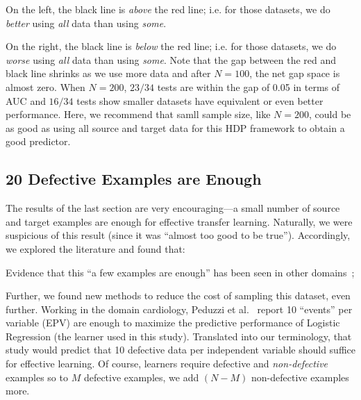 \squishlist
\item
  On the left, the black line is
  {\em above} the red line; i.e. for those datasets, we do {\em better} using
  {\em all} data than using {\em some}.
  \item
On the right, the black line is {\em below} the red
line; i.e. for those datasets, we do {\em worse}
using {\em all} data than using {\em some}.
\squishend
Note that the gap between the red and black line
shrinks as we use more data and after $N=100$, the
net gap space is almost zero.  When $N=200$, $23/34$
tests are within the gap of 0.05 in terms of AUC and
$16/34$ tests show smaller datasets have equivalent
or even better performance. Here, we recommend that
samll sample size, like $N=200$, could be as good as using all source and target data for this HDP framework to obtain a good predictor.






\subsection{20 Defective Examples  are Enough}


The results of the last section are very encouraging---a small number of source
and target examples are enough for effective transfer learning. Naturally,
we were suspicious of this result (since it was ``almost too good to be true'').
Accordingly, we explored the literature and found that:
\squishlist
    \item Evidence that this ``a few examples are enough'' has been seen in other domains~\cite{peduzzi1996simulation}; 
    \item Further, we found new methods to reduce the cost of sampling this dataset, even further. 
\squishend
Working in the domain cardiology,
  Peduzzi et al.~\cite{peduzzi1996simulation}
  report 10 ``events'' per variable (EPV) are enough to maximize the predictive performance
  of  Logistic Regression (the learner used in this study). Translated into our terminology,
  that study would predict that  10 defective data per independent variable should
  suffice for effective learning. Of course, learners require defective and {\em non-defective}
  examples so to $M$ defective examples, we add $(N-M)$ non-defective examples more.

